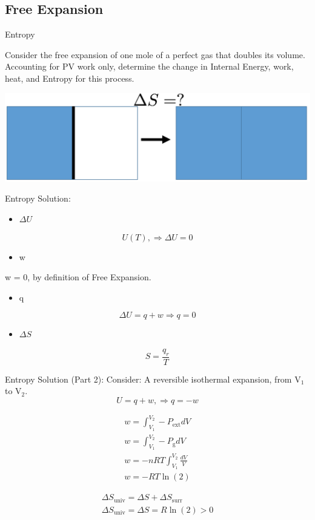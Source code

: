 \documentclass[t,10pt,mathserif,xcolor=pst,pdftex]{beamer}
\newcommand{\be}{\begin{equation}}
\newcommand{\ee}{\end{equation}}
\begin{document}
\subsection{Free Expansion}


\begin{frame}{Entropy}

Consider the free expansion of one mole of a perfect gas that doubles its volume. 
Accounting for PV work only, determine the change in Internal Energy, work, heat, and Entropy for this process. 

\includegraphics[height=0.40\textheight,width=1.0\textwidth]{gas.png}

\end{frame}

\begin{frame}{Entropy Solution:}
\begin{itemize}
\item $\Delta U$
\end{itemize}
\be
U(T), \Rightarrow \Delta U = 0
\ee

\begin{itemize}
\item w
\end{itemize}
w = 0, by definition of Free Expansion.

\begin{itemize}
\item q
\end{itemize}
\be
\Delta U = q + w \Rightarrow q = 0
\ee

\begin{itemize}
\item $\Delta S$
\end{itemize}
\be
S = \frac{q_r}{T}
\ee

\end{frame}

\begin{frame}{Entropy Solution (Part 2):}
Consider: A reversible isothermal expansion, from V$_1$ to V$_2$. 
\be
U = q + w, \Rightarrow q = -w
\ee

\begin{align*}
w = \int_{V_1}^{V_2} - P_{\text{ext}}dV\\
w = \int_{V_1}^{V_2} - P_{\text{g}}dV\\
w = -nRT \int_{V_1}^{V_2} \frac{dV}{V}\\
w = -RT\ln(2)
\end{align*}

\begin{align}
\Delta S_{\text{univ}} = \Delta S + \Delta S_{\text{surr}}\\
\Delta S_{\text{univ}} = \Delta S = R\ln(2) > 0
\end{align}

\end{frame}
\end{document}
